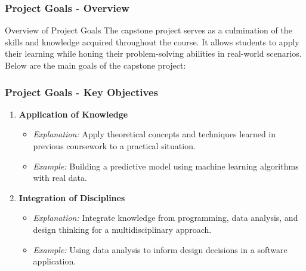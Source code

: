 \documentclass[aspectratio=169]{beamer}
\begin{document}
\begin{frame}[fragile]
    \frametitle{Project Goals - Overview}
    \begin{block}{Overview of Project Goals}
        The capstone project serves as a culmination of the skills and knowledge acquired throughout the course. 
        It allows students to apply their learning while honing their problem-solving abilities in real-world scenarios. 
        Below are the main goals of the capstone project:
    \end{block}
\end{frame}

\begin{frame}[fragile]
    \frametitle{Project Goals - Key Objectives}
    \begin{enumerate}
        \item \textbf{Application of Knowledge}
            \begin{itemize}
                \item \textit{Explanation:} Apply theoretical concepts and techniques learned in previous coursework to a practical situation.
                \item \textit{Example:} Building a predictive model using machine learning algorithms with real data.
            \end{itemize}

        \item \textbf{Integration of Disciplines}
            \begin{itemize}
                \item \textit{Explanation:} Integrate knowledge from programming, data analysis, and design thinking for a multidisciplinary approach.
                \item \textit{Example:} Using data analysis to inform design decisions in a software application.
            \end{itemize}
    \end{enumerate}
\end{frame}
\end{document}
